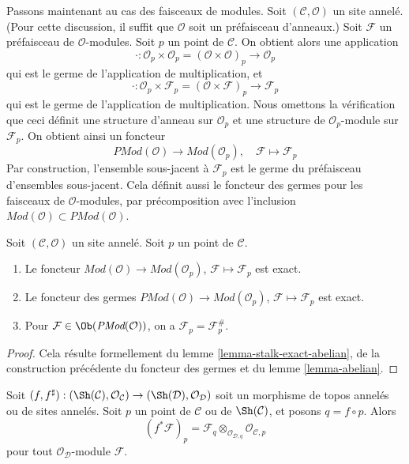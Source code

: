\noindent
Passons maintenant au cas des faisceaux de modules.
Soit $(\mathcal{C}, \mathcal{O})$ un site annelé.
(Pour cette discussion, il suffit que $\mathcal{O}$ soit un préfaisceau
d'anneaux.) Soit $\mathcal{F}$ un préfaisceau de $\mathcal{O}$-modules.
Soit $p$ un point de $\mathcal{C}$. On obtient alors une application
$$
\cdot :
\mathcal{O}_p \times \mathcal{O}_p
=
(\mathcal{O} \times \mathcal{O})_p
\longrightarrow
\mathcal{O}_p
$$
qui est le germe de l'application de multiplication, et
$$
\cdot :
\mathcal{O}_p \times \mathcal{F}_p
=
(\mathcal{O} \times \mathcal{F})_p
\longrightarrow
\mathcal{F}_p
$$
qui est le germe de l'application de multiplication. Nous omettons la
vérification que ceci définit une structure d'anneau sur $\mathcal{O}_p$ et une
structure de $\mathcal{O}_p$-module sur $\mathcal{F}_p$. On obtient ainsi un foncteur
$$
\textit{PMod}(\mathcal{O}) \longrightarrow \textit{Mod}(\mathcal{O}_p), \quad
\mathcal{F} \longmapsto \mathcal{F}_p
$$
Par construction, l'ensemble sous-jacent à $\mathcal{F}_p$ est le germe du
préfaisceau d'ensembles sous-jacent. Cela définit aussi le foncteur des germes pour
les faisceaux de $\mathcal{O}$-modules, par précomposition avec l'inclusion
$\textit{Mod}(\mathcal{O}) \subset \textit{PMod}(\mathcal{O})$.

\begin{lemma}
\label{lemma-stalk-exact-modules}
Soit $(\mathcal{C}, \mathcal{O})$ un site annelé.
Soit $p$ un point de $\mathcal{C}$.
\begin{enumerate}
\item Le foncteur
$\textit{Mod}(\mathcal{O}) \to \textit{Mod}(\mathcal{O}_p)$,
$\mathcal{F} \mapsto \mathcal{F}_p$ est exact.
\item Le foncteur des germes
$\textit{PMod}(\mathcal{O}) \to \textit{Mod}(\mathcal{O}_p)$,
$\mathcal{F} \mapsto \mathcal{F}_p$
est exact.
\item Pour $\mathcal{F} \in \Ob(\textit{PMod}(\mathcal{O}))$, on a
$\mathcal{F}_p = \mathcal{F}^\#_p$.
\end{enumerate}
\end{lemma}

\begin{proof}
Cela résulte formellement du lemme \ref{lemma-stalk-exact-abelian}, de la
construction précédente du foncteur des germes et du lemme \ref{lemma-abelian}.
\end{proof}

\begin{lemma}
\label{lemma-pullback-stalk}
Soit
$(f, f^\sharp) :
(\Sh(\mathcal{C}), \mathcal{O}_\mathcal{C})
\to
(\Sh(\mathcal{D}), \mathcal{O}_\mathcal{D})$
soit un morphisme de topos annelés ou de sites annelés.
Soit $p$ un point de $\mathcal{C}$ ou de $\Sh(\mathcal{C})$, et posons
$q = f \circ p$. Alors
$$
(f^*\mathcal{F})_p =
\mathcal{F}_q \otimes_{\mathcal{O}_{\mathcal{D}, q}}
\mathcal{O}_{\mathcal{C}, p}
$$
pour tout $\mathcal{O}_\mathcal{D}$-module $\mathcal{F}$.
\end{lemma}

